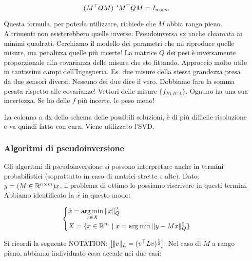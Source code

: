 \[
	\inv{(M^\top QM)}M^\top QM = I_{m\times m}
\]

Questa formula, per poterla utilizzare, richiede che $M$ abbia rango pieno. Altrimenti non esisterebbero quelle inverse. Pseudoinversa sx anche chiamata ai minimi quadrati. Cerchiamo il modello dei parametri che mi riproduce quelle misure, ma penalizza quelle più incerte! La matrice $Q$ dei pesi è inversamente proporzionale alla covarianza delle misure che sto fittando. Approccio molto utile in tantissimi campi dell'Ingegneria. Es. due misure della stessa grandezza presa da due sensori diversi. Nessuno dei due dice il vero. Dobbiamo fare la somma pesata rispetto alle covarianze! Vettori delle misure $\{f_{ELICA}\}$. Ognuno ha una sua incertezza. Se ho delle $f$ più incerte, le peso meno!

La colonna a dx dello schema delle possibili soluzioni, è di più difficile risoluzione e va quindi fatto con cura. Viene utilizzato l'SVD.

\subsubsection{Algoritmi di pseudoinversione}

Gli algoritmi di pseudoinversione si possono interpretare anche in termini probabilistici (soprattutto in caso di matrici strette e alte). Dato: $y=(M\in\mathbb{R}^{n\times m})x$, il problema di ottimo lo possiamo riscrivere in questi termini. Abbiamo identificato la $\hat{x}$ in questo modo:

\[
	\left\{
	\begin{aligned}
	&\hat{x}=\operatorname*{arg\,min}_{x\in X}{\lVert x\rVert_Q^2}\\
	&X=\{x\in\mathbb{R}^m\ |\ x=\operatorname*{arg\,min}{\lVert y-Mx\rVert_Q^2}\}
	\end{aligned}
	\right. 
\]

Si ricordi la seguente NOTATION: $[\lVert v\rVert_L=(v^\top Lv)^{\frac{1}{2}}]$. Nel caso di $M$ a rango pieno, abbiamo individuato cosa accade nei due casi:

